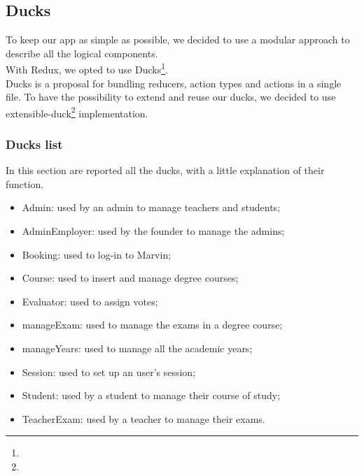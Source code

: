 
	\subsection{Ducks}
	To keep our app as simple as possible, we decided to use a modular approach to describe all the logical components.\\
	With Redux, we opted to use Ducks\footnote{}.\\
	Ducks is a proposal for bundling reducers, action types and actions in a single file. To have the possibility to extend and reuse our ducks, we decided to use extensible-duck\footnote{} implementation.

	\subsubsection{Ducks list}
	In this section are reported all the ducks, with a little explanation of their function.
	\begin{itemize}
		\item Admin: used by an admin to manage teachers and students;
		\item AdminEmployer: used by the founder to manage the admins;
		\item Booking: used to log-in to Marvin;
		\item Course: used to insert and manage degree courses;
		\item Evaluator: used to assign votes;
		\item manageExam: used to manage the exams in a degree course;
		\item manageYears: used to manage all the academic years;
		\item Session: used to set up an user's session;
		\item Student: used by a student to manage their course of study;
		\item TeacherExam: used by a teacher to manage their exams.
	\end{itemize}

